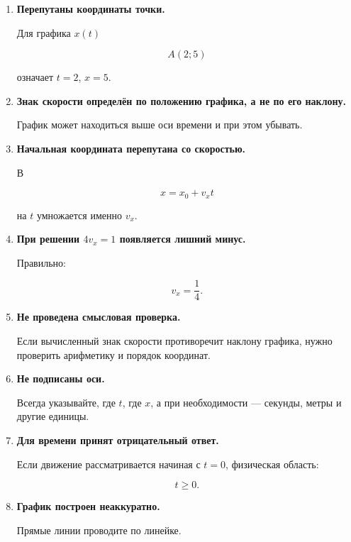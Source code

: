 \documentclass[a4paper,12pt]{article}
\begin{document}
\begin{enumerate}[label=\arabic*),leftmargin=*,itemsep=0.55em]

    \item \textbf{Перепутаны координаты точки.}

    Для графика \(x(t)\)

    \[
    A(2;5)
    \]

    означает \(t=2\), \(x=5\).

    \item \textbf{Знак скорости определён по положению графика, а не по его наклону.}

    График может находиться выше оси времени и при этом убывать.

    \item \textbf{Начальная координата перепутана со скоростью.}

    В

    \[
    x=x_0+v_xt
    \]

    на \(t\) умножается именно \(v_x\).

    \item \textbf{При решении \(4v_x=1\) появляется лишний минус.}

    Правильно:

    \[
    v_x=\frac14.
    \]

    \item \textbf{Не проведена смысловая проверка.}

    Если вычисленный знак скорости противоречит наклону графика,
    нужно проверить арифметику и порядок координат.

    \item \textbf{Не подписаны оси.}

    Всегда указывайте, где \(t\), где \(x\), а при необходимости ---
    секунды, метры и другие единицы.

    \item \textbf{Для времени принят отрицательный ответ.}

    Если движение рассматривается начиная с \(t=0\), физическая область:

    \[
    t\ge0.
    \]

    \item \textbf{График построен неаккуратно.}

    Прямые линии проводите по линейке.

\end{enumerate}

\end{document}
